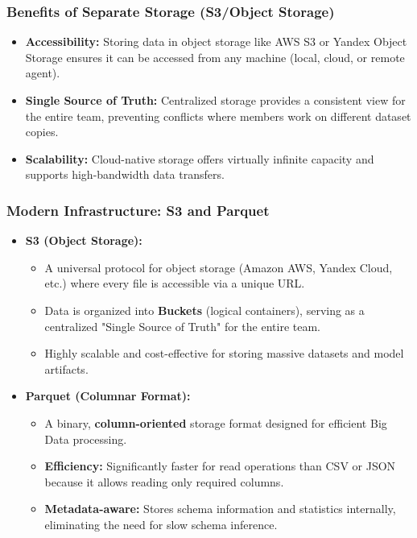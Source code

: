 \documentclass[aspectratio=169]{beamer}
\begin{document}
\begin{frame}[t]
    \frametitle{Benefits of Separate Storage (S3/Object Storage)}
    \begin{itemize}
        \item \textbf{Accessibility:} Storing data in object storage like AWS S3 or Yandex Object Storage ensures it can be accessed from any machine (local, cloud, or remote agent).
        \item \textbf{Single Source of Truth:} Centralized storage provides a consistent view for the entire team, preventing conflicts where members work on different dataset copies.
        \item \textbf{Scalability:} Cloud-native storage offers virtually infinite capacity and supports high-bandwidth data transfers.
    \end{itemize}
\end{frame}


\begin{frame}[t]
    \frametitle{Modern Infrastructure: S3 and Parquet}
    \vspace*{-0.5cm}
    \begin{itemize}
        \item \textbf{S3 (Object Storage):} 
        \begin{itemize}
            \item A universal protocol for object storage (Amazon AWS, Yandex Cloud, etc.) where every file is accessible via a unique URL.
            \item Data is organized into \textbf{Buckets} (logical containers), serving as a centralized "Single Source of Truth" for the entire team.
            \item Highly scalable and cost-effective for storing massive datasets and model artifacts.
        \end{itemize}
        \item \textbf{Parquet (Columnar Format):}
        \begin{itemize}
            \item A binary, \textbf{column-oriented} storage format designed for efficient Big Data processing.
            \item \textbf{Efficiency:} Significantly faster for read operations than CSV or JSON because it allows reading only required columns.
            \item \textbf{Metadata-aware:} Stores schema information and statistics internally, eliminating the need for slow schema inference.
        \end{itemize}
    \end{itemize}
\end{frame}
\end{document}
